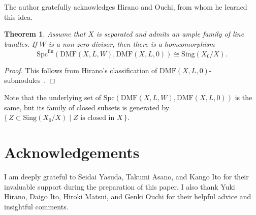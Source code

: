\documentclass[11pt]{amsart}
\theoremstyle{definition}
\theoremstyle{plain}
\newtheorem{thm}[defn]{Theorem}
\theoremstyle{remark}
\newcommand{\mo}{\mathrm}
\newcommand{\Spc}{\mathrm{Spc}}
\numberwithin{equation}{section}
\begin{document}
The author gratefully acknowledges Hirano and Ouchi, from whom he learned this idea.



\begin{thm}
Assume that \(X\) is separated and admits an ample family of line bundles.  
If \(W\) is a non-zero-divisor, then there is a homeomorphism
\[
\Spc^{\mo{fin}}(\mathrm{DMF}(X, L, W), \mathrm{DMF}(X, L, 0)) \cong \mathrm{Sing}(X_0/X).
\]
\end{thm}
\begin{proof}
This follows from Hirano's classification of \(\mathrm{DMF}(X, L, 0)\)-submodules~\cite{Hi}.
\end{proof}

Note that the underlying set of \(\Spc(\mathrm{DMF}(X, L, W), \mathrm{DMF}(X, L, 0))\) is the same, but its family of closed subsets is generated by \(\{\, Z \subset \mathrm{Sing}(X_0/X) \mid Z \text{ is closed in } X \,\}\).

\section*{Acknowledgements}

I am deeply grateful to Seidai Yasuda, Takumi Asano, and Kango Ito for their invaluable support during the preparation of this paper.  
I also thank Yuki Hirano, Daigo Ito, Hiroki Matsui, and Genki Ouchi for their helpful advice and insightful comments.



\end{document}
